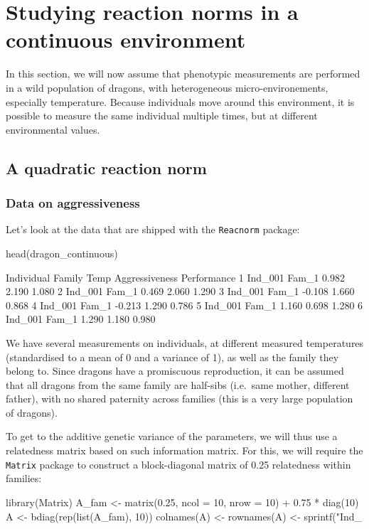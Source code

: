 \documentclass[a4paper,12pt,twoside]{article}
\begin{document}
\section{Studying reaction norms in a continuous environment}

In this section, we will now assume that phenotypic measurements are performed in a wild population of dragons, with heterogeneous micro-environements, especially temperature.
Because individuals move around this environment, it is possible to measure the same individual multiple times, but at different environmental values.

\subsection{A quadratic reaction norm}

\subsubsection{Data on aggressiveness}

Let's look at the data that are shipped with the \texttt{Reacnorm} package:
\begin{Rinput}
head(dragon_continuous)
\end{Rinput}
\begin{Routput}
  Individual Family   Temp Aggressiveness Performance
1    Ind_001  Fam_1  0.982          2.190       1.080
2    Ind_001  Fam_1  0.469          2.060       1.290
3    Ind_001  Fam_1 -0.108          1.660       0.868
4    Ind_001  Fam_1 -0.213          1.290       0.786
5    Ind_001  Fam_1  1.160          0.698       1.280
6    Ind_001  Fam_1  1.290          1.180       0.980
\end{Routput}
We have several measurements on individuals, at different measured temperatures (standardised to a mean of 0 and a variance of 1), as well as the family they belong to. Since dragons have a promiscuous reproduction, it can be assumed that all dragons from the same family are half-sibs (i.e.\ same mother, different father), with no shared paternity across families (this is a very large population of dragons).

To get to the additive genetic variance of the parameters, we will thus use a relatedness matrix based on such information matrix. For this, we will require the \texttt{Matrix} package to construct a block-diagonal matrix of 0.25 relatedness within families:
\begin{Rinput}
library(Matrix)
A_fam <- matrix(0.25, ncol = 10, nrow = 10) + 0.75 * diag(10)
A <- bdiag(rep(list(A_fam), 10))
colnames(A) <- rownames(A) <- sprintf("Ind_%
\end{Rinput}
\end{document}
